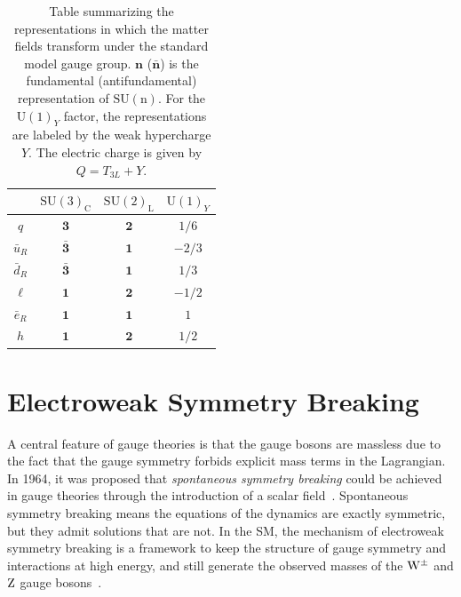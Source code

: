 \begin{table}
\centering
\begin{tabular}{c|ccc}
&$\mathrm{SU(3)}_{\mathrm{C}}$&$\mathrm{SU(2)}_{\mathrm{L}}$&$\mathrm{U(1)}_Y$ \\\hline
$q$ & $\mathbf{3}$ & $\mathbf{2}$ & $1/6$\\
$\bar u_R$ & $\mathbf{\bar 3}$ & $\mathbf{1}$ & $-2/3$\\
$\bar d_R$ & $\mathbf{\bar 3}$ & $\mathbf{1}$ & $1/3$\\
$\ell$ & $\mathbf{1}$ & $\mathbf{2}$ & $-1/2$\\
$\bar e_R$ & $\mathbf{1}$ & $\mathbf{1}$ & $1$\\\hline
$h$ & $\mathbf{1}$ & $\mathbf{2}$ & $1/2$
\end{tabular}
\caption{\label{tab:representations} Table summarizing the
    representations in which the matter fields transform under the standard
    model gauge group. $\mathbf{n}$ ($\mathbf{\bar n}$) is the
    fundamental (antifundamental) representation
    of $\mathrm{SU(n)}$. For the $\mathrm{U(1)}_Y$ factor, the
    representations are labeled by the weak hypercharge $Y$. The electric charge is given by $Q = T_{3L}+Y$. }
\end{table}


\section{Electroweak Symmetry Breaking}
\label{sec:ewsb}
A central feature of gauge theories is that the gauge bosons are
massless due to the fact that the gauge symmetry forbids explicit mass
terms in the Lagrangian. In 1964, it was proposed that
\emph{spontaneous symmetry breaking} could be achieved in gauge
theories through the introduction of a scalar
field~\cite{PhysRevLett.13.321,HIGGS1964132,PhysRevLett.13.508,PhysRevLett.13.585,PhysRev.145.1156,PhysRev.155.1554}. Spontaneous symmetry breaking
means the equations of the dynamics are exactly symmetric, but they
admit solutions that are not. In the SM, the mechanism of electroweak symmetry breaking
is a framework to keep the structure of gauge symmetry and
interactions at high energy, and still generate the observed masses
of the $\mathrm{W}^{\pm}$ and $\mathrm{Z}$ gauge
bosons~\cite{PhysRevLett.19.1264,GLASHOW1961579,Salam:1968rm}. 

